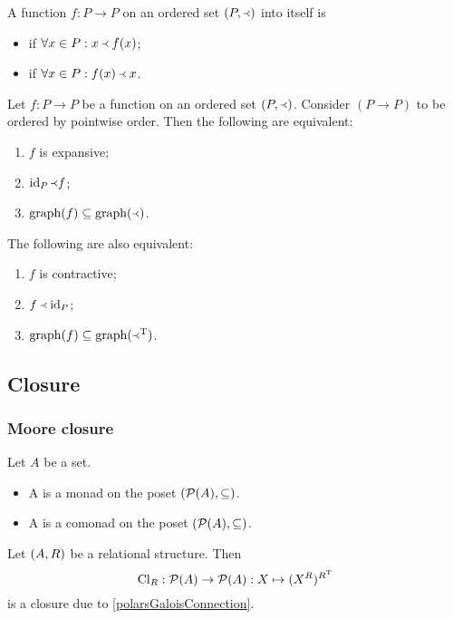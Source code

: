 \begin{definition}
A function $f: P\to P$ on an ordered set $(P,\Yleft)$ into itself is
\begin{itemize}
\item {} if $\forall x\in P: x\Yleft f(x)$;
\item {} if $\forall x\in P: f(x)\Yleft x$.
\end{itemize}
\end{definition}

\begin{lemma}
Let $f:P\to P$ be a function on an ordered set $(P,\Yleft)$. Consider $(P\to P)$ to be ordered by pointwise order. Then the following are equivalent:
\begin{enumerate}
\item $f$ is expansive;
\item $\operatorname{id}_P \Yleft f$;
\item $\operatorname{graph}(f) \subseteq \operatorname{graph}(\Yleft)$.
\end{enumerate}
The following are also equivalent:
\begin{enumerate}
\item $f$ is contractive;
\item $f \Yleft \operatorname{id}_P$;
\item $\operatorname{graph}(f) \subseteq \operatorname{graph}(\Yleft^{\mathrm{T}})$.
\end{enumerate}
\end{lemma}



\subsection{Closure}

\subsubsection{Moore closure}
\begin{definition}
Let $A$ be a set.
\begin{itemize}
\item A  is a monad on the poset $\sSet{\powerset(A), \subseteq}$.
\item A  is a comonad on the poset $\sSet{\powerset(A), \subseteq}$.
\end{itemize}
\end{definition}

\begin{example}
Let $\sSet{A,R}$ be a relational structure. Then
\[ \operatorname{Cl}_R: \operatorname{\mathcal{P}}(A) \to \operatorname{\mathcal{P}}(A): X \mapsto (X^{R})^{R^{\mathrm{T}}} \]
is a closure due to \ref{polarsGaloisConnection}.
\end{example}


